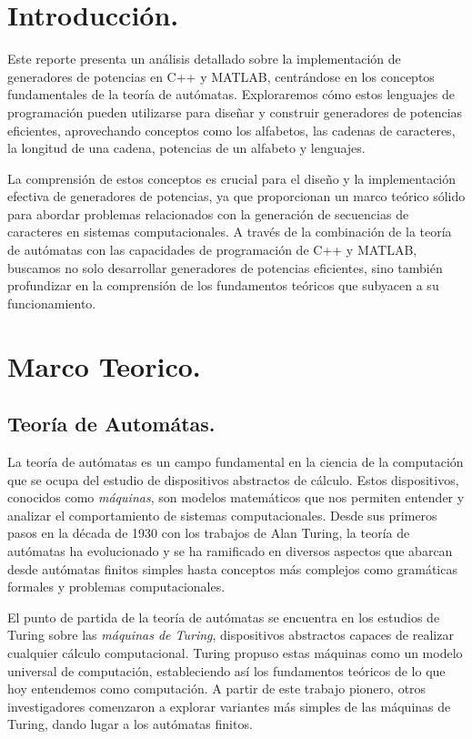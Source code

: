 \documentclass{article}
\begin{document}
\section{Introducción.}
Este reporte presenta un análisis detallado sobre la implementación de generadores de potencias en C++ y MATLAB,
centrándose en los conceptos fundamentales de la teoría de autómatas. Exploraremos cómo estos lenguajes de programación
pueden utilizarse para diseñar y construir generadores de potencias eficientes, aprovechando conceptos como los alfabetos,
las cadenas de caracteres, la longitud de una cadena, potencias de un alfabeto y lenguajes.

La comprensión de estos conceptos es crucial para el diseño y la implementación efectiva de generadores de potencias,
ya que proporcionan un marco teórico sólido para abordar problemas relacionados con la generación de secuencias de caracteres en
sistemas computacionales. A través de la combinación de la teoría de autómatas con las capacidades de programación de C++ y MATLAB,
buscamos no solo desarrollar generadores de potencias eficientes, sino también profundizar en la comprensión de los fundamentos
teóricos que subyacen a su funcionamiento.

\section{Marco Teorico.}
    \subsection{Teoría de Automátas.}
        La teoría de autómatas es un campo fundamental en la ciencia de la computación que se ocupa del estudio de dispositivos
        abstractos de cálculo. Estos dispositivos, conocidos como \textit{máquinas}, son modelos matemáticos que nos permiten entender y
        analizar el comportamiento de sistemas computacionales. Desde sus primeros pasos en la década de 1930 con los trabajos de
        Alan Turing, la teoría de autómatas ha evolucionado y se ha ramificado en diversos aspectos que abarcan desde autómatas finitos
        simples hasta conceptos más complejos como gramáticas formales y problemas computacionales.

        El punto de partida de la teoría de autómatas se encuentra en los estudios de Turing sobre las \textit{máquinas de Turing},
        dispositivos abstractos capaces de realizar cualquier cálculo computacional. Turing propuso estas máquinas como un modelo universal
        de computación, estableciendo así los fundamentos teóricos de lo que hoy entendemos como computación. A partir de este trabajo pionero,
        otros investigadores comenzaron a explorar variantes más simples de las máquinas de Turing, dando lugar a los autómatas finitos.
\end{document}
